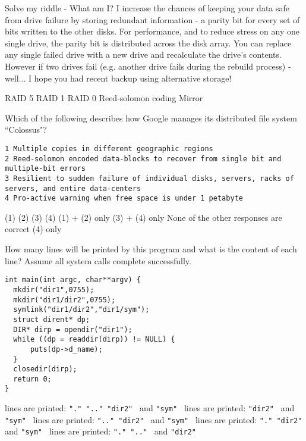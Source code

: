 \variant
Solve my riddle - What am I? I increase the chances of keeping your data safe from drive failure by storing redundant information - a parity bit for every set of bits written to the other disks.  For performance, and to reduce stress on any one single drive, the parity bit is distributed across the disk array. You can replace any single failed drive with a new drive and recalculate the drive's contents. However if two drives fail (e.g. another drive fails during the rebuild process) - well... I hope you had recent backup using alternative storage!
\begin{answers}
\correctanswer RAID 5
\answer RAID 1
\answer RAID 0
\answer Reed-solomon coding
\answer Mirror
\end{answers}
\begin{solution}
\end{solution}

\variant
Which of the following describes how Google manages its distributed file system ``Colossus"?
\begin{verbatim}
1 Multiple copies in different geographic regions
2 Reed-solomon encoded data-blocks to recover from single bit and multiple-bit errors
3 Resilient to sudden failure of individual disks, servers, racks of servers, and entire data-centers
4 Pro-active warning when free space is under 1 petabyte
\end{verbatim}
\begin{answers}
\correctanswer (1) (2) (3) (4)
\answer (1) + (2) only 
\answer (3) + (4) only
\answer None of the other responses are correct
\answer (4) only
\end{answers}
\begin{solution}
\end{solution}


\variant
How many lines will be printed by this program and what is the content of each line? Assume all system calls complete successfully.
\begin{verbatim}
int main(int argc, char**argv) {
  mkdir("dir1",0755);
  mkdir("dir1/dir2",0755);
  symlink("dir1/dir2","dir1/sym");
  struct dirent* dp;
  DIR* dirp = opendir("dir1");
  while ((dp = readdir(dirp)) != NULL) {
      puts(dp->d_name);
  }
  closedir(dirp);
  return 0;
}
\end{verbatim}
\begin{answers}
 lines are printed:  {\tt "."  ".."  "dir2" } and  {\tt "sym" } 
 lines are printed:  {\tt  "dir2" } and  {\tt "sym" }
 lines are printed:  {\tt ".."  "dir2" } and  {\tt "sym" }
 lines are printed:  {\tt "."  "dir2" } and  {\tt "sym" }
 lines are printed:  {\tt "." ".." } and  {\tt "dir2" }
\end{answers}
\begin{solution}
\end{solution}

